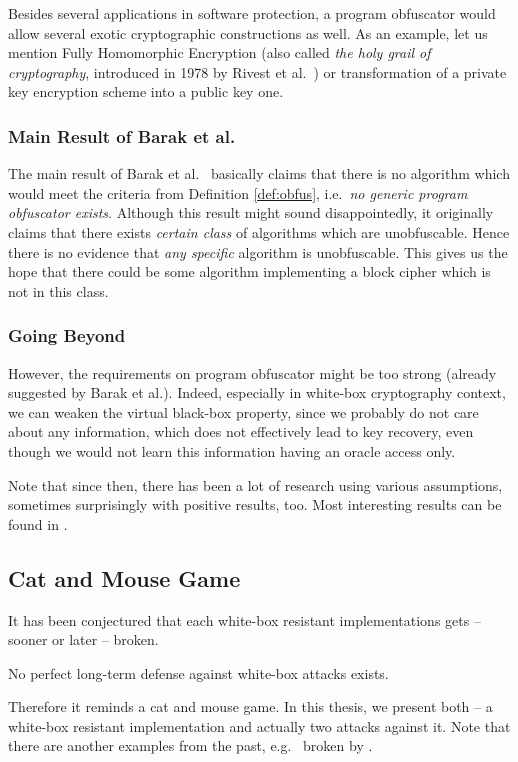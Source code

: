 	Besides several applications in software protection, a program obfuscator would allow several exotic cryptographic constructions as well. As an example, let us mention Fully Homomorphic Encryption (also called {\em the holy grail of cryptography}, introduced in 1978 by Rivest et al.\ \cite{rivest1978data}) or transformation of a private key encryption scheme into a public key one.

\subsubsection{Main Result of Barak et al.}
	
	The main result of Barak et al.\ \cite{barak2001possibility} basically claims that there is no algorithm which would meet the criteria from Definition \ref{def:obfus}, i.e.\ {\em no generic program obfuscator exists}. Although this result might sound disappointedly, it originally claims that there exists {\em certain class} of algorithms which are unobfuscable. Hence there is no evidence that {\em any specific} algorithm is unobfuscable. This gives us the hope that there could be some algorithm implementing a block cipher which is not in this class.

\subsubsection{Going Beyond}
	
	However, the requirements on program obfuscator might be too strong (already suggested by Barak et al.). Indeed, especially in white-box cryptography context, we can weaken the virtual black-box property, since we probably do not care about any information, which does not effectively lead to key recovery, even though we would not learn this information having an oracle access only.
	
	Note that since then, there has been a lot of research using various assumptions, sometimes surprisingly with positive results, too. Most interesting results can be found in \cite{barak2014protecting, brakerski2014virtual}.



\subsection{Cat and Mouse Game}
\label{sec:catmouse}

It has been conjectured that each white-box resistant implementations gets -- sooner or later -- broken.
\begin{conj}
	No perfect long-term defense against white-box attacks exists.
\end{conj}
Therefore it reminds a cat and mouse game. In this thesis, we present both -- a white-box resistant implementation and actually two attacks against it. Note that there are another examples from the past, e.g.\ \cite{chow2002des} broken by \cite{jacob2002attacking}.
